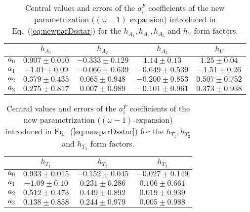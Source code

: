 \documentclass[aps,superscriptaddress,showpacs,nofootinbib,11pt]{revtex4-1}
\newcommand\tstrut{\rule{0pt}{2.9ex}}       %
\begin{document}
\begin{table}[h]
\begin{ruledtabular}
\begin{center}
\begin{tabular}{ccccc}
 & $h_{A_1}$&$h_{A_2}$&$h_{A_3}$&$h_V$
\\ \hline \tstrut
$a_0$&$0.907\pm0.010$&\hspace{-.25cm}$-0.333\pm 0.129$&\hspace{.25cm}$1.14\pm0.13$&\hspace{-.05cm}$1.25\pm0.04$\\
$a_1$&\hspace{-.25cm}$-1.01\pm0.09$&\hspace{-.25cm}$-0.066\pm0.639$&$-0.649\pm0.539$&\hspace{-.25cm}$-1.51\pm0.26$\\
$a_2$&$0.379\pm0.435$&$0.065\pm0.948$&$-0.200\pm0.853$&$0.507\pm0.752$\\
$a_3$&$0.275\pm0.817$&$0.007\pm0.989$&$-0.101\pm0.961$& $0.373\pm0.938$\\
\end{tabular}
    \caption{Central values and errors of the $a_i^F$ coefficients of the new  parametrization ($(\omega-1)$ expansion)  introduced in Eq.~(\ref{eq:newparDsstar}) for the $h_{A_1}, h_{A_2}, h_{A_3}$ and $h_V$ form factors. }
   \label{tab:ha123vdstar_newpar}
   \end{center}
   \end{ruledtabular}
\end{table}
%
\begin{table}[h]
\begin{ruledtabular}
\begin{center}
\begin{tabular}{cccc}
 & $h_{T_1}$&$h_{T_2}$&$h_{T_3}$
\\ \hline \tstrut
$a_0$&$0.933\pm0.015$&\hspace{-.25cm}$-0.152\pm0.045$&\hspace{-.25cm}$-0.027\pm0.149$\\
$a_1$&\hspace{-.25cm}$-1.09\pm0.10$&$0.231\pm0.286$&$0.106\pm0.661$\\
$a_2$&$0.512\pm0.473$&$0.449\pm0.892$&$0.019\pm0.939$\\
$a_3$&$0.138\pm0.858$&$0.244\pm0.979$&$0.005\pm0.988$\\
\end{tabular}
    \caption{Central values and errors of the $a_i^F$ coefficients of the new  parametrization ($(\omega-1)$-expansion)  introduced in Eq.~(\ref{eq:newparDsstar}) for the $h_{T_1}, h_{T_2}$ and $h_{T_3}$  form factors. }
   \label{tab:ht123dstar_newpar}
   \end{center}
   \end{ruledtabular}
\end{table}
%
\end{document}
